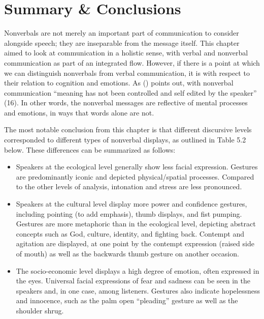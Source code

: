 \section{Summary \& Conclusions}

Nonverbals are not merely an important part of communication to consider alongside speech; they are inseparable from the message itself. This chapter aimed to look at communication in a holistic sense, with verbal and nonverbal communication as part of an integrated flow. However, if there is a point at which we can distinguish nonverbals from verbal communication, it is with respect to their relation to cognition and emotions. As \citeauthor{Beattie2016} (\citeyear{Beattie2016}) points out, with nonverbal communication ``meaning has not been controlled and self edited by the speaker'' (16). In other words, the nonverbal messages are reflective of mental processes and emotions, in ways that words alone are not.

The most notable conclusion from this chapter is that different discursive levels corresponded to different types of nonverbal displays, as outlined in Table 5.2 below. These differences can be summarized as follows:

\begin{itemize}
\item Speakers at the ecological level generally show less facial expression. Gestures are predominantly iconic and depicted physical/spatial processes. Compared to the other levels of analysis, intonation and stress are less pronounced.  

\item Speakers at the cultural level display more power and confidence gestures, including pointing (to add emphasis), thumb displays, and fist pumping. Gestures are more metaphoric than in the ecological level, depicting abstract concepts such as God, culture, identity, and fighting back. Contempt and agitation are displayed, at one point by the contempt expression (raised side of mouth) as well as the backwards thumb gesture on another occasion.

\item The socio-economic level displays a high degree of emotion, often expressed in the eyes. Universal facial expressions of fear and sadness can be seen in the speakers and, in one case, among listeners. Gestures also indicate hopelessness and innocence, such as the palm open ``pleading'' gesture as well as the shoulder shrug.  \end{itemize}

